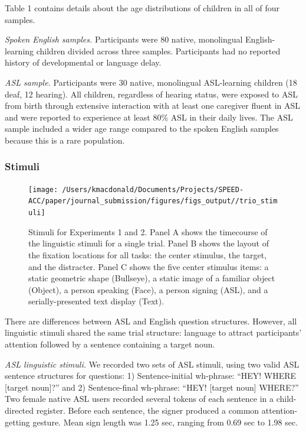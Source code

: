 \documentclass[english,floatsintext,man]{apa6}
\begin{document}
Table 1 contains details about the age distributions of children in all
of four samples.

\emph{Spoken English samples.} Participants were 80 native, monolingual
English-learning children divided across three samples. Participants had
no reported history of developmental or language delay.

\emph{ASL sample.} Participants were 30 native, monolingual ASL-learning
children (18 deaf, 12 hearing). All children, regardless of hearing
status, were exposed to ASL from birth through extensive interaction
with at least one caregiver fluent in ASL and were reported to
experience at least 80\% ASL in their daily lives. The ASL sample
included a wider age range compared to the spoken English samples
because this is a rare population.

\hypertarget{stimuli}{%
\subsubsection{Stimuli}\label{stimuli}}

\begin{figure}[!t]

{\centering \texttt{[image: /Users/kmacdonald/Documents/Projects/SPEED-ACC/paper/journal\_submission/figures/figs\_output//trio\_stimuli]} 

}

\caption{Stimuli for Experiments 1 and 2. Panel A shows the timecourse of the linguistic stimuli for a single trial. Panel B shows the layout of the fixation locations for all tasks: the center stimulus, the target, and the distracter. Panel C shows the five center stimulus items: a static geometric shape (Bullseye), a static image of a familiar object (Object), a person speaking (Face), a person signing (ASL), and a serially-presented text display (Text).}\label{fig:trio-stim}
\end{figure}

There are differences between ASL and English question structures.
However, all linguistic stimuli shared the same trial structure:
language to attract participants' attention followed by a sentence
containing a target noun.

\emph{ASL linguistic stimuli.} We recorded two sets of ASL stimuli,
using two valid ASL sentence structures for questions: 1)
Sentence-initial wh-phrase: \enquote{HEY! WHERE {[}target noun{]}?} and
2) Sentence-final wh-phrase: \enquote{HEY! {[}target noun{]} WHERE?} Two
female native ASL users recorded several tokens of each sentence in a
child-directed register. Before each sentence, the signer produced a
common attention-getting gesture. Mean sign length was 1.25 sec, ranging
from 0.69 sec to 1.98 sec.
\end{document}
